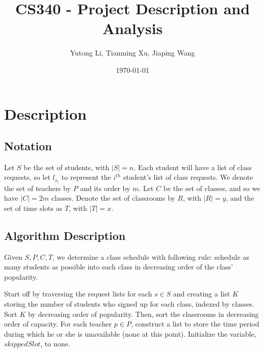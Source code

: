 \documentclass[11pt, oneside]{article}   	%
\title{CS340 - Project Description and Analysis}
\author{Yutong Li, Tianming Xu, Jiaping Wang}
\date{\today}							%
\begin{document}
\maketitle

\section{Description}
\subsection{Notation}
Let $S$ be the set of students, with $|S|=n$. Each student will have a list of class requests, so let $l_{s_i}$ to represent the $i^{th}$ student's list of class requests. We denote the set of teachers by $P$ and its order by $m$. Let $C$ be the set of classes, and so we have $|C|=2m$ classes. Denote the set of classrooms by $R$, with $|R|=y$, and the set of time slots as $T$, with $|T|=x$. 
\subsection{Algorithm Description}
Given $S, P, C, T$, we determine a class schedule with following rule: schedule as many students as possible into each class in decreasing order of the class' popularity. \par 
Start off by traversing the request lists for each $s\in S$ and creating a list $K$ storing the number of students who signed up for each class, indexed by classes. Sort $K$ by decreasing order of popularity. Then, sort the classrooms in decreasing order of capacity. For each teacher $p\in P$, construct a list to store the time period during which he or she is unavailable (none at this point). Initialize the variable, $skippedSlot$, to none. 

\end{document}

